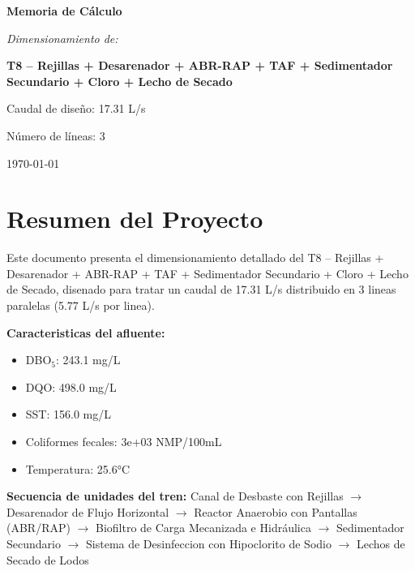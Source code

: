 \documentclass[12pt,a4paper]{article}
\begin{document}
\begin{titlepage}
\centering
\vspace*{2cm}

{\Huge\bfseries Memoria de Cálculo\par}
\vspace{1.5cm}

{\Large\itshape Dimensionamiento de:\par}
\vspace{0.5cm}

{\LARGE\bfseries T8 – Rejillas + Desarenador + ABR-RAP + TAF + Sedimentador Secundario + Cloro + Lecho de Secado\par}
\vspace{2cm}

{\large Caudal de diseño: 17.31 L/s\par}
{\large Número de líneas: 3\par}
\vfill
{\large\today\par}
\end{titlepage}

\tableofcontents

\listoffigures

\listoftables

\newpage
\section{Resumen del Proyecto}

Este documento presenta el dimensionamiento detallado del T8 – Rejillas + Desarenador + ABR-RAP + TAF + Sedimentador Secundario + Cloro + Lecho de Secado, disenado para tratar un caudal de 17.31 L/s distribuido en 3 lineas paralelas (5.77 L/s por linea).

\textbf{Caracteristicas del afluente:}
\begin{itemize}
    \item DBO$_5$: 243.1 mg/L
    \item DQO: 498.0 mg/L
    \item SST: 156.0 mg/L
    \item Coliformes fecales: 3e+03 NMP/100mL
    \item Temperatura: 25.6°C
\end{itemize}

\textbf{Secuencia de unidades del tren:} 
Canal de Desbaste con Rejillas $\rightarrow$ Desarenador de Flujo Horizontal $\rightarrow$ Reactor Anaerobio con Pantallas (ABR/RAP) $\rightarrow$ Biofiltro de Carga Mecanizada e Hidráulica $\rightarrow$ Sedimentador Secundario $\rightarrow$ Sistema de Desinfeccion con Hipoclorito de Sodio $\rightarrow$ Lechos de Secado de Lodos
\end{document}

